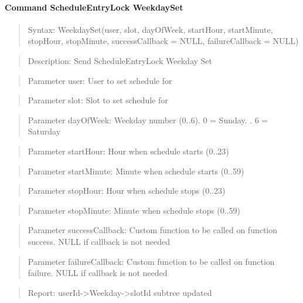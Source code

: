 \paragraph{Command ScheduleEntryLock WeekdaySet}
\begin{quote}Syntax: WeekdaySet(user, slot, dayOfWeek, startHour, startMinute, stopHour, stopMinute, successCallback = NULL, failureCallback = NULL)\end{quote}
\begin{quote}Description: Send ScheduleEntryLock Weekday Set\end{quote}
\begin{quote}Parameter user: User to set schedule for\end{quote}
\begin{quote}Parameter slot: Slot to set schedule for\end{quote}
\begin{quote}Parameter dayOfWeek: Weekday number (0..6). 0 = Sunday. . 6 = Saturday\end{quote}
\begin{quote}Parameter startHour: Hour when schedule starts (0..23)\end{quote}
\begin{quote}Parameter startMinute: Minute when schedule starts (0..59)\end{quote}
\begin{quote}Parameter stopHour: Hour when schedule stops (0..23)\end{quote}
\begin{quote}Parameter stopMinute: Minute when schedule stops (0..59)\end{quote}
\begin{quote}Parameter successCallback: Custom function to be called on function success. NULL if callback is not needed\end{quote}
\begin{quote}Parameter failureCallback: Custom function to be called on function failure. NULL if callback is not needed\end{quote}
\begin{quote}Report: userId->Weekday->slotId subtree updated\end{quote}

